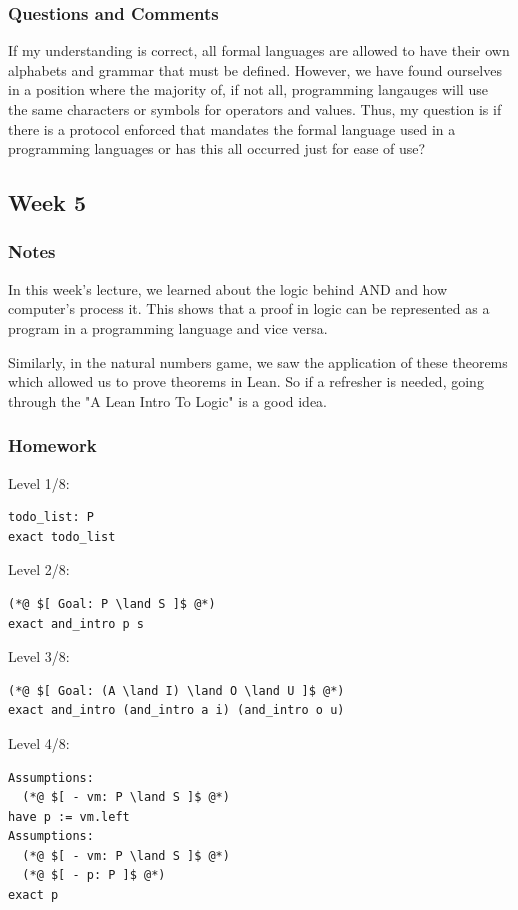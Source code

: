 \documentclass{article}
\theoremstyle{theorem}
\theoremstyle{definition}
\theoremstyle{remark}
\begin{document}
\subsubsection*{Questions and Comments}

If my understanding is correct, all formal languages are allowed to have their own alphabets and grammar that must be defined. However, we have found ourselves in a position where the majority of, if not all, programming langauges will use the same characters or symbols for operators and values. Thus, my question is if there is a protocol enforced that mandates the formal language used in a programming languages or has this all occurred just for ease of use?

\subsection{Week 5}

\subsubsection*{Notes}

In this week's lecture, we learned about the logic behind AND and how computer's process it. This shows that a proof in logic can be represented as a program in a programming language and vice versa.

Similarly, in the natural numbers game, we saw the application of these theorems which allowed us to prove theorems in Lean. So if a refresher is needed, going through the "A Lean Intro To Logic" is a good idea.

\subsubsection*{Homework}
Level 1/8:
\begin{lstlisting}
todo_list: P
exact todo_list
\end{lstlisting}

Level 2/8:
\begin{lstlisting}
(*@ $[ Goal: P \land S ]$ @*)
exact and_intro p s
\end{lstlisting}

Level 3/8:
\begin{lstlisting}
(*@ $[ Goal: (A \land I) \land O \land U ]$ @*)
exact and_intro (and_intro a i) (and_intro o u)
\end{lstlisting}

Level 4/8:
\begin{lstlisting}
Assumptions:
  (*@ $[ - vm: P \land S ]$ @*)
have p := vm.left
Assumptions: 
  (*@ $[ - vm: P \land S ]$ @*)
  (*@ $[ - p: P ]$ @*)
exact p
\end{lstlisting}
\end{document}
